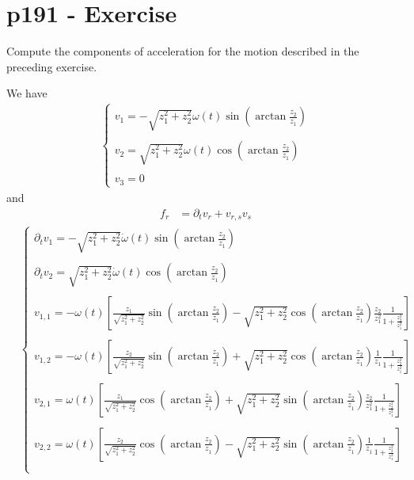 \section{p191 - Exercise}
\begin{tcolorbox}
Compute the components of acceleration for the motion described in the preceding exercise.
\end{tcolorbox}
We have
\begin{align}
\left\{\begin{array}{l}
v_1 = -\sqrt{z^{2}_1+z^{2}_2}\omega(t)\sin\left(\arctan\frac{z^{}_2}{z^{}_1}\right)\\\\
v_2 = \sqrt{z^{2}_1+z^{2}_2}\omega(t)\cos\left(\arctan\frac{z^{}_2}{z^{}_1}\right)\\\\
v_3 = 0
\end{array}\right.
\end{align}
and 
\begin{align}
f_r &= \partial_tv_r + v_{r,s}v_s
\end{align}
\begin{align}
&\left\{\begin{array}{l}
\partial_t v_1 = -\sqrt{z^{2}_1+z^{2}_2}\dot{\omega}(t)\sin\left(\arctan\frac{z^{}_2}{z^{}_1}\right)\\\\
\partial_t v_2 = \sqrt{z^{2}_1+z^{2}_2}\dot{\omega}(t)\cos\left(\arctan\frac{z^{}_2}{z^{}_1}\right)\\\\
v_{1,1}= -\omega(t)\left[\frac{z_1}{\sqrt{z^{2}_1+z^{2}_2}}\sin\left(\arctan\frac{z^{}_2}{z^{}_1}\right) -\sqrt{z^{2}_1+z^{2}_2}\cos\left(\arctan\frac{z^{}_2}{z^{}_1}\right)\frac{z_2}{z_1^2}\frac{1}{1+\frac{z_2^2}{z_1^2}}\right]\\\\
v_{1,2}= -\omega(t)\left[\frac{z_2}{\sqrt{z^{2}_1+z^{2}_2}}\sin\left(\arctan\frac{z^{}_2}{z^{}_1}\right) +\sqrt{z^{2}_1+z^{2}_2}\cos\left(\arctan\frac{z^{}_2}{z^{}_1}\right)\frac{1}{z^{}_1}\frac{1}{1+\frac{z_2^2}{z_1^2}}\right]\\\\
v_{2,1}= \omega(t)\left[\frac{z_1}{\sqrt{z^{2}_1+z^{2}_2}}\cos\left(\arctan\frac{z^{}_2}{z^{}_1}\right) +\sqrt{z^{2}_1+z^{2}_2}\sin\left(\arctan\frac{z^{}_2}{z^{}_1}\right)\frac{z_2}{z_1^2}\frac{1}{1+\frac{z_2^2}{z_1^2}}\right]\\\\
v_{2,2}= \omega(t)\left[\frac{z_2}{\sqrt{z^{2}_1+z^{2}_2}}\cos\left(\arctan\frac{z^{}_2}{z^{}_1}\right) -\sqrt{z^{2}_1+z^{2}_2}\sin\left(\arctan\frac{z^{}_2}{z^{}_1}\right)\frac{1}{z^{}_1}\frac{1}{1+\frac{z_2^2}{z_1^2}}\right]\\\\
\end{array}\right.
\end{align}
